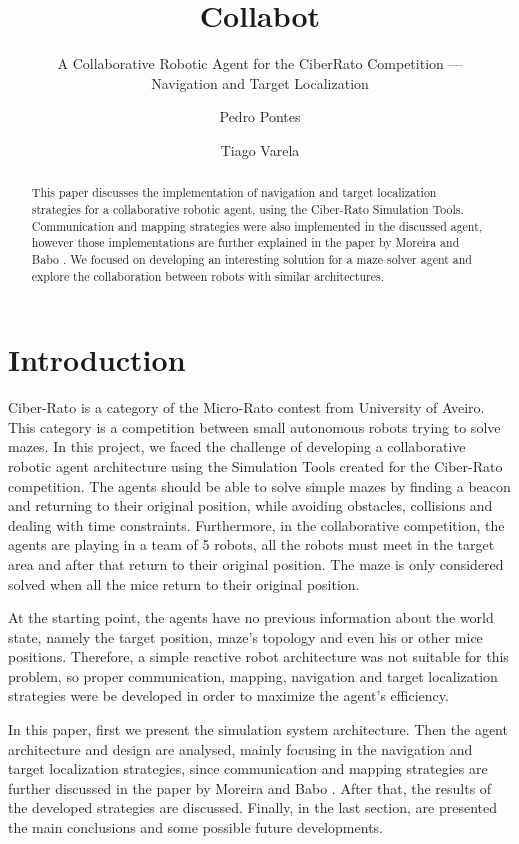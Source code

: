 \documentclass[oribibl]{llncs}
\title{Collabot}
\subtitle{A Collaborative Robotic Agent for the CiberRato Competition ---\\
Navigation and Target Localization}
\author{Pedro Pontes \and Tiago Varela}
\institute{Faculdade de Engenharia da Universidade do Porto}
\begin{document}
\maketitle
\begin{abstract}
This paper discusses the implementation of navigation and target localization strategies for a  collaborative robotic agent, using the Ciber-Rato Simulation Tools. Communication and mapping strategies were also implemented in the discussed agent, however those implementations are further explained in the paper by Moreira and Babo \cite{MoreiraBabo2012}.
We focused on developing an interesting solution for a maze solver agent and explore the collaboration between robots with similar architectures.
\end{abstract}

\section{Introduction}
Ciber-Rato is a category of the Micro-Rato contest from University of Aveiro.
This category is a competition between small autonomous robots trying to solve mazes. \cite{Lau2002}
In this project, we faced the challenge of developing a collaborative robotic agent architecture using the Simulation Tools created for the Ciber-Rato competition. The agents should be able to solve simple mazes by finding a beacon and returning to their original position, while avoiding obstacles, collisions and dealing with time constraints. Furthermore, in the collaborative competition, the agents are playing in a team of 5 robots, all the robots must meet in the target area and after that return to their original position. The maze is only considered solved when all the mice return to their original position.

At the starting point, the agents have no previous information about the world state, namely the target position, maze's topology and even his or other mice positions. Therefore, a simple reactive robot architecture was not suitable for this problem, so proper communication, mapping, navigation and target localization strategies were be developed in order to maximize the agent's efficiency.

In this paper, first we present the simulation system architecture. Then the agent architecture and design are analysed, mainly focusing in the navigation and target localization strategies, since communication and mapping strategies are further discussed in the paper by Moreira and Babo \cite{MoreiraBabo2012}. After that, the results of the developed strategies are discussed. Finally, in the last section, are presented the main conclusions and some possible future developments.
\end{document}
